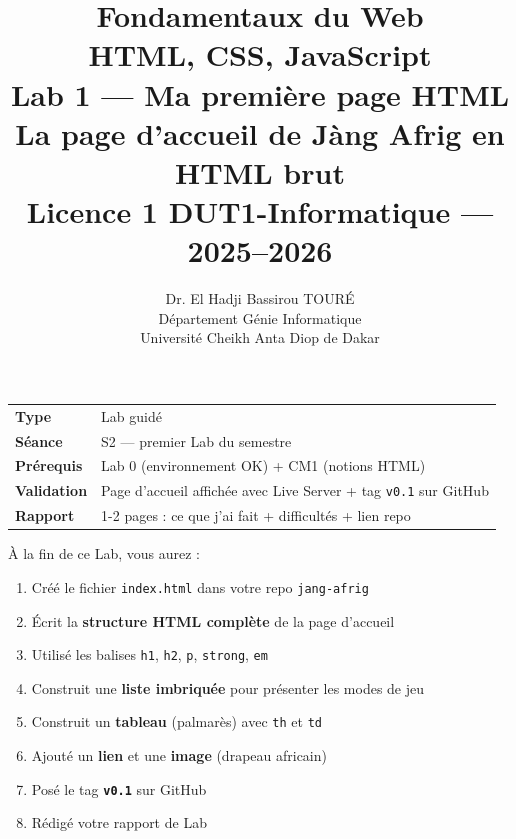\documentclass[11pt,a4paper]{article}
\title{%
\vspace{-1cm}
\textbf{\LARGE Fondamentaux du Web}\\
\textbf{\LARGE HTML, CSS, JavaScript}\\[0.8cm]
\textbf{\huge Lab 1 --- Ma première page HTML}\\[0.3cm]
\textbf{\Large La page d'accueil de Jàng Afrig en HTML brut}\\[0.5cm]
\large Licence 1 DUT1-Informatique --- 2025--2026}
\author{Dr. El Hadji Bassirou TOURÉ\\
Département Génie Informatique\\
Université Cheikh Anta Diop de Dakar}
\date{}
\begin{document}
\maketitle
\thispagestyle{empty}

\vspace{0.5cm}

\begin{prereqbox}
\begin{center}
\begin{tabular}{ll}
\toprule
\textbf{Type} & Lab guidé \\
\textbf{Séance} & S2 --- premier Lab du semestre \\
\textbf{Prérequis} & Lab 0 (environnement OK) + CM1 (notions HTML) \\
\textbf{Validation} & Page d'accueil affichée avec Live Server + tag \texttt{v0.1} sur GitHub \\
\textbf{Rapport} & 1-2 pages : ce que j'ai fait + difficultés + lien repo \\
\bottomrule
\end{tabular}
\end{center}
\end{prereqbox}

\begin{objectifbox}
À la fin de ce Lab, vous aurez :
\begin{enumerate}[nosep]
    \item Créé le fichier \texttt{index.html} dans votre repo \texttt{jang-afrig}
    \item Écrit la \textbf{structure HTML complète} de la page d'accueil
    \item Utilisé les balises \texttt{h1}, \texttt{h2}, \texttt{p}, \texttt{strong}, \texttt{em}
    \item Construit une \textbf{liste imbriquée} pour présenter les modes de jeu
    \item Construit un \textbf{tableau} (palmarès) avec \texttt{th} et \texttt{td}
    \item Ajouté un \textbf{lien} et une \textbf{image} (drapeau africain)
    \item Posé le tag \textbf{\texttt{v0.1}} sur GitHub
    \item Rédigé votre rapport de Lab
\end{enumerate}
\end{objectifbox}
\end{document}
